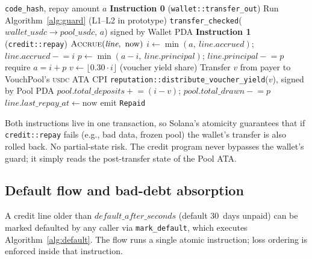 \documentclass[10pt,conference,letterpaper]{IEEEtran}
\theoremstyle{definition}
\newcommand{\codehash}{\texttt{code\_hash}}
\newcommand{\USDC}{\textsc{usdc}}
\begin{document}
\begin{algorithm}[t]
\caption{Credit repayment (2-instruction atomic flow).}
\label{alg:repay}
\begin{algorithmic}[1]
\Require \codehash, repay amount $a$
\Statex \textbf{Instruction 0} (\texttt{wallet::transfer\_out})
\State Run Algorithm~\ref{alg:guard} (L1--L2 in prototype)
\State \texttt{transfer\_checked}($\mathit{wallet\_usdc} \to \mathit{pool\_usdc}$, $a$)
  signed by Wallet PDA
\Statex \textbf{Instruction 1} (\texttt{credit::repay})
\State $\textsc{Accrue}(\textit{line},\ \mathrm{now})$
\State $i \gets \min(a,\ \textit{line}.\mathit{accrued})$;
  $\textit{line}.\mathit{accrued} \mathrel{-}= i$
\State $p \gets \min(a-i,\ \textit{line}.\mathit{principal})$;
  $\textit{line}.\mathit{principal} \mathrel{-}= p$
\State require $a = i + p$ 
\State $v \gets \lfloor 0.30\cdot i \rfloor$ (voucher yield share)
\State Transfer $v$ from payer to VouchPool's \USDC{} ATA
\State CPI \texttt{reputation::distribute\_voucher\_yield}($v$),
  signed by Pool PDA
\State $\mathit{pool}.\mathit{total\_deposits} \mathrel{+}= (i - v)$;
  $\mathit{pool}.\mathit{total\_drawn} \mathrel{-}= p$
\State $\textit{line}.\mathit{last\_repay\_at} \gets \mathrm{now}$
\State emit \texttt{Repaid}
\end{algorithmic}
\end{algorithm}

Both instructions live in one transaction, so Solana's atomicity
guarantees that if \texttt{credit::repay} fails (e.g., bad data,
frozen pool) the wallet's transfer is also rolled back. No partial-state
risk. The credit program never bypasses the wallet's guard; it simply
reads the post-transfer state of the Pool ATA.

\subsection{Default flow and bad-debt absorption}

A credit line older than $\mathit{default\_after\_seconds}$ (default
30~days unpaid) can be marked defaulted by any caller via
\texttt{mark\_default}, which executes Algorithm~\ref{alg:default}. The
flow runs a single atomic instruction; loss ordering is enforced inside
that instruction.
\end{document}
